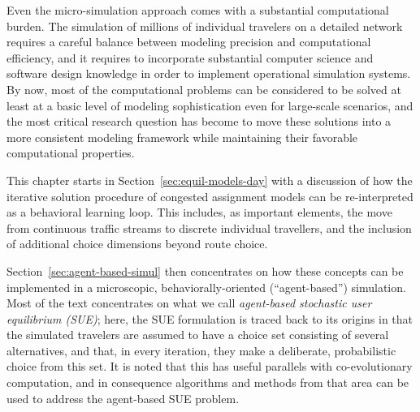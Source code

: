 
Even the micro-simulation approach comes with a substantial
computational burden. The simulation of millions of individual travelers
on a detailed network requires a careful balance between modeling precision
and computational efficiency, and it requires to incorporate substantial
computer science and software design knowledge in order to implement
operational simulation systems. By now, most of the computational problems 
can be considered to be solved at least at a basic level
of modeling sophistication even for large-scale scenarios, and the most
critical research question has become to move these solutions into
a more consistent modeling framework while maintaining their favorable
computational properties.


This chapter starts in Section~\ref{sec:equil-models-day} with a discussion
of how the iterative solution procedure of congested assignment models
can be re-interpreted as a behavioral learning loop.  This includes,
as important elements, the move from continuous traffic streams to
discrete individual travellers, and the inclusion of additional choice
dimensions beyond route choice.  

Section~\ref{sec:agent-based-simul} then concentrates on how these
concepts can be implemented in a microscopic, behaviorally-oriented
(``agent-based'') simulation.  Most of the text concentrates on what
we call \emph{agent-based stochastic user equilibrium (SUE)};
here, the SUE formulation is traced
back to its origins in that the simulated travelers are assumed to
have a choice set consisting of several alternatives, and that, in
every iteration, they make a deliberate, probabilistic choice from
this set.  It is noted that this has useful parallels with
co-evolutionary computation, and in consequence algorithms and methods
from that area can be used to address the agent-based SUE problem.


